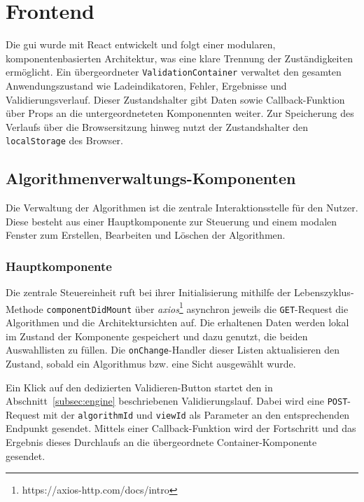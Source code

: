 \section{Frontend}
\label{sec:frontendimp}

Die \gls{gui} wurde mit React entwickelt und folgt einer modularen, komponentenbasierten Architektur, was eine klare Trennung der Zuständigkeiten ermöglicht. Ein übergeordneter \texttt{ValidationContainer} verwaltet den gesamten Anwendungszustand wie Ladeindikatoren, Fehler, Ergebnisse und Validierungsverlauf. Dieser Zustandshalter gibt Daten sowie Callback-Funktion über Props an  die untergeordneteten Komponennten weiter. Zur Speicherung des Verlaufs über die Browsersitzung hinweg nutzt der Zustandshalter den \texttt{localStorage} des Browser.

\subsection{Algorithmenverwaltungs-Komponenten}
\label{subsec:verwaltung}

Die Verwaltung der Algorithmen ist die zentrale Interaktionsstelle für den Nutzer. Diese besteht aus einer Hauptkomponente zur Steuerung und einem modalen Fenster zum Erstellen, Bearbeiten und Löschen der Algorithmen.

\subsubsection*{Hauptkomponente}

Die zentrale Steuereinheit ruft bei ihrer Initialisierung mithilfe der Lebenszyklus-Methode \texttt{componentDidMount} über \textit{axios}\footnote{https://axios-http.com/docs/intro} asynchron jeweils die \texttt{GET}-Request die Algorithmen und die Architektursichten auf. Die erhaltenen Daten werden lokal im Zustand der Komponente gespeichert und dazu genutzt, die beiden Auswahllisten zu füllen. Die \texttt{onChange}-Handler dieser Listen aktualisieren den Zustand, sobald ein Algorithmus bzw. eine Sicht ausgewählt wurde.

Ein Klick auf den dedizierten \glqq Validieren\grqq{}-Button startet den in Abschnitt~\ref{subsec:engine} beschriebenen Validierungslauf. Dabei wird eine \texttt{POST}-Request mit der \texttt{algorithmId} und \texttt{viewId} als Parameter an den entsprechenden Endpunkt gesendet. Mittels einer Callback-Funktion wird der Fortschritt und das Ergebnis dieses Durchlaufs an die übergeordnete Container-Komponente gesendet.

